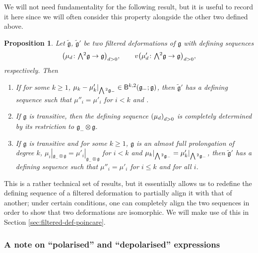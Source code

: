 \documentclass[11pt]{article}
\numberwithin{equation}{section}
\numberwithin{equation}{section}
\newtheorem{Proposition}[Theorem]{Proposition}
 { \theoremstyle{definition}
\newtheorem{Definition}[Theorem]{Definition}
\newtheorem{Note}[Theorem]{Note}
\newtheorem{Example}[Theorem]{Example}
\newtheorem{Remark}[Theorem]{Remark} }
\newcommand{\fg}{\mathfrak{g}}
\newcommand{\ssB}{\mathsf{B}}
\newcommand{\fgtilde}{\widetilde{\mathfrak{g}}}
\newcommand{\Wedge}{\mathchoice{{\textstyle\bigwedge}}{\bigwedge}{\bigwedge}{\bigwedge}}	%
\newcommand{\1}{\mathbbm{1}}
\begin{document}
We will not need fundamentality for the following result, but it is useful to record it here since we will often consider this property alongside the other two defined above.

\begin{Proposition}\label{prop:def-seq-redef}
	Let $\fgtilde$, $\fgtilde'$ be two filtered deformations of $\fg$ with defining sequences
\[
\bigl(\mu_d\colon\Wedge^2\fg\to\fg\bigr)_{d> 0}, \qquad v\bigl(\mu'_d\colon\Wedge^2\fg\to\fg\bigr)_{d> 0},
\]
 respectively. Then
	\begin{enumerate}\itemsep=0pt
		\item[$(1)$] {\rm\cite[\emph{Proposition}~2.3]{Cheng1998}} If for some $k\geq 1$, $\mu_k-\mu_k'|_{\Wedge^2\fg_-}\in\ssB^{k,2}(\fg_-;\fg)$, then $\fgtilde'$ has a defining sequence  such that $\mu''_i=\mu'_i$ for $i<k$ and \smash{$\mu''_k|_{\Wedge^2\fg_-}=\mu_k|_{\Wedge^2\fg_-}$}.
			\label{item:def-seq-redef-1}
		\item[$(2)$] {\rm\cite[\emph{Proposition}~2.5]{Cheng1998}} If $\fg$ is transitive, then the defining sequence $\qty(\mu_d)_{d> 0}$ is completely determined by its restriction to $\fg_-\otimes\fg$.
			\label{item:def-seq-redef-2}
		\item[$(3)$] {\rm\cite[\emph{Proposition}~2.6]{Cheng1998}} If $\fg$ is transitive and for some $k\geq 1$, $\fg$ is an almost full prolongation of degree $k$, $\mu_i|_{\fg_-\otimes\fg}=\mu'_i|_{\fg_-\otimes\fg}$ for $i<k$ and $\mu_k|_{\Wedge^2\fg_-}=\mu'_k|_{\Wedge^2\fg_-}$, then $\fgtilde'$ has a defining sequence  such that $\mu''_i=\mu'_i$ for $i\leq k$ and \smash{$\mu''_i|_{\Wedge^2\fg_-}=\mu_i'|_{\Wedge^2\fg_-}$} for all $i$.
			\label{item:def-seq-redef-3}
	\end{enumerate}
\end{Proposition}

This is a rather technical set of results, but it essentially allows us to redefine the defining sequence of a filtered deformation to partially align it with that of another; under certain conditions, one can completely align the two sequences in order to show that two deformations are isomorphic. We will make use of this in Section \ref{sec:filtered-def-poincare}.

\subsubsection{A note on ``polarised'' and ``depolarised'' expressions}
\label{sec:polarisation}
\end{document}
